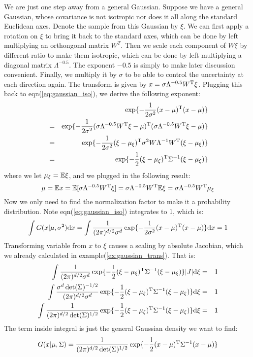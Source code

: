We are just one step away from a general Gaussian. Suppose we 
have a general Gaussian, whose covariance is not isotropic nor 
does it all along the standard Euclidean axes. Denote the sample
from this Gaussian by $\xi$. We can first apply 
a rotation on $\xi$ to bring it back to the standard axes,
which can be done by left multiplying an
orthongonal matrix $W^T$. Then we scale each component of $W\xi$
by different ratio to make them isotropic, which can be done 
by left multiplying a diagonal matrix $\Lambda^{-0.5}$. The 
exponent $-0.5$ is simply to make later discussion convenient. 
Finally, we multiply it by $\sigma$ to be able to control 
the uncertainty at each direction again. The transform is 
given by $x = \sigma \Lambda^{-0.5}W^\mathrm{T} \xi$. Plugging
this back to eqn(\ref{eq:gaussian_iso}), we derive the following
exponent:
\begin{eqnarray}
	&&\exp\{ -\frac{1}{2\sigma^2} (x-\mu)^\mathrm{T}(x-\mu)\} \\
	&=& \exp\{ -\frac{1}{2\sigma^2} 
	(\sigma \Lambda^{-0.5}W^\mathrm{T} \xi-\mu)^\mathrm{T}(\sigma \Lambda^{-0.5}W^\mathrm{T} \xi-\mu)\} \\
	&=& \exp\{ -\frac{1}{2\sigma^2} 
	(\xi-\mu_\xi)^\mathrm{T}\sigma^2W\Lambda^{-1}W^\mathrm{T}(\xi-\mu_\xi)\} \\
	&=& \exp\{ -\frac{1}{2} 
	(\xi-\mu_\xi)^\mathrm{T}\Sigma^{-1}(\xi-\mu_\xi)\} 
\end{eqnarray}
where we let $\mu_\xi = \mathbb{E}\xi$, and we plugged in the following result:
\begin{equation}
	\mu = \mathbb{E} x = \mathbb{E}[\sigma \Lambda^{-0.5}W^\mathrm{T} \xi]
	=\sigma \Lambda^{-0.5}W^\mathrm{T} \mathbb{E} \xi
	=\sigma \Lambda^{-0.5}W^\mathrm{T} \mu_\xi
\end{equation}
Now we only need to find the normalization factor to make it a 
probability distribution. 
Note eqn(\ref{eq:gaussian_iso}) integrates to 1, which is:
\begin{equation}
	\int G(x|\mu, \sigma^2)\mathrm{d}x =  \int \frac{1}{(2\pi)^{d/2}\sigma^d}
	\exp\{ -\frac{1}{2\sigma^2} (x-\mu)^\mathrm{T}(x-\mu)\} \mathrm{d}x = 1
\end{equation}
Transforming variable from $x$ to $\xi$ causes a scaling by absolute Jacobian, 
which we already calculated in example(\ref{ex:gaussian_trans}). 
That is:
\begin{eqnarray}
	\int \frac{1}{(2\pi)^{d/2}\sigma^d}
	\exp\{ -\frac{1}{2} (\xi-\mu_\xi)^\mathrm{T}\Sigma^{-1}(\xi-\mu_\xi)\} 
	|J| \mathrm{d}\xi &=& 1 \\
	\int \frac{\sigma^d \det(\Sigma)^{-1/2}}{(2\pi)^{d/2}\sigma^d}
	\exp\{ -\frac{1}{2} (\xi-\mu_\xi)^\mathrm{T}\Sigma^{-1}(\xi-\mu_\xi)\} 
	 \mathrm{d}\xi &=& 1 \\
	 \int \frac{1}{(2\pi)^{d/2}\det(\Sigma)^{1/2}}
	\exp\{ -\frac{1}{2} (\xi-\mu_\xi)^\mathrm{T}\Sigma^{-1}(\xi-\mu_\xi)\} 
	 \mathrm{d}\xi &=& 1  
\end{eqnarray}
The term inside integral is just the general Gaussian density we want 
to find:
\begin{equation}
	G(x|\mu, \Sigma) = \frac{1}{(2\pi)^{d/2}\det(\Sigma)^{1/2}}
	\exp\{ -\frac{1}{2} (x-\mu)^\mathrm{T}\Sigma^{-1}(x-\mu)\} 
	\label{eq:gaussian_gen}
\end{equation}


